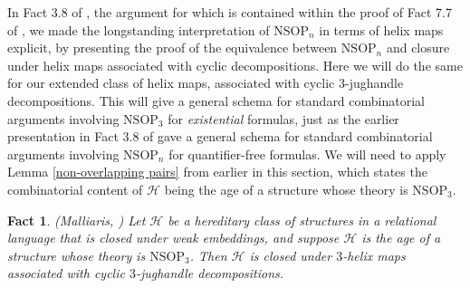 \documentclass{amsart}
\newtheorem{fact}[theorem]{Fact}
\theoremstyle{definition}
\theoremstyle{remark}
\numberwithin{equation}{section}
\begin{document}
In Fact 3.8 of \cite{ApproxOrder}, the argument for which is contained within the proof of Fact 7.7 of \cite{Mal10b}, we made the longstanding interpretation of $\mathrm{NSOP}_{n}$ in terms of helix maps explicit, by presenting the proof of the equivalence between $\mathrm{NSOP}_{n}$ and closure under  helix maps associated with cyclic decompositions. Here we will do the same for our extended class of helix maps, associated with cyclic $3$-jughandle decompositions. This will give a general schema for standard combinatorial arguments involving $\mathrm{NSOP}_{3}$ for \textit{existential} formulas, just as the earlier presentation in Fact 3.8 of \cite{ApproxOrder} gave a general schema for standard combinatorial arguments involving $\mathrm{NSOP}_{n}$ for quantifier-free formulas. We will need to apply Lemma \ref{non-overlapping pairs} from earlier in this section, which states the combinatorial content of $\mathcal{H}$ being the age of a structure whose theory is $\mathrm{NSOP}_{3}$.



\begin{fact}
   \label{closure under jughandle helix maps} \emph{(Malliaris, \cite{Mal10b})} Let $\mathcal{H}$ be a hereditary class of structures in a relational language that is closed under weak embeddings, and suppose $\mathcal{H}$ is the age of a structure whose theory is $\mathrm{NSOP}_{3}$. Then $\mathcal{H}$ is closed under $3$-helix maps associated with cyclic $3$-jughandle decompositions.
\end{fact}
\end{document}
